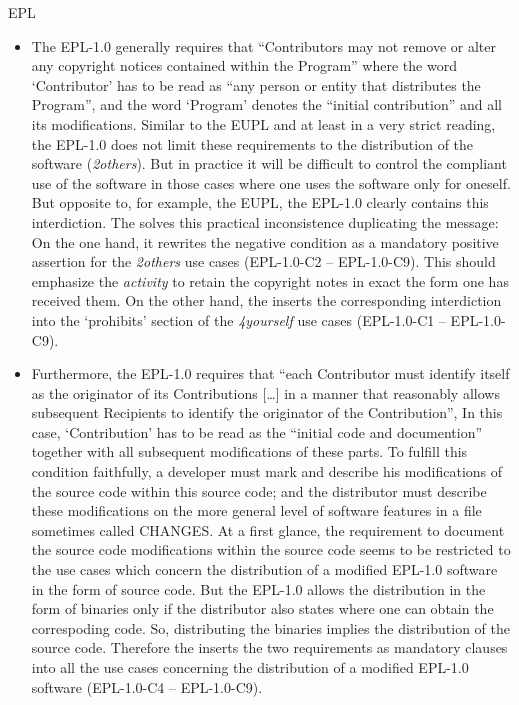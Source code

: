 \begin{license}{EPL}
\begin{itemize}
  \item The EPL-1.0 generally requires that \enquote{Contributors may not remove or
    alter any copyright notices contained within the Program} where
    the word `Contributor' has to be read as \enquote{any person or entity that
    distributes the Program}, and the word `Program' denotes the
    \enquote{initial contribution} and all its modifications. 
    Similar to the EUPL and at least in a very strict reading, the EPL-1.0 does not
    limit these requirements to the distribution of the software
    (\emph{2others}). But in practice it will be difficult to control the
    compliant use of the software in those cases where one uses the software
    only for oneself. But opposite to, for example, the EUPL, the EPL-1.0 clearly
    contains this interdiction. The \oslic{} solves this practical inconsistence
    duplicating the message: On the one hand, it rewrites the negative condition
    as a mandatory positive assertion for the \emph{2others} use cases (EPL-1.0-C2 --
    EPL-1.0-C9). This should emphasize the \emph{activity} to retain the copyright
    notes in exact the form one has received them. On the other hand, the \oslic{}
    inserts the corresponding interdiction into the `prohibits' section of the
    \emph{4yourself} use cases (EPL-1.0-C1 -- EPL-1.0-C9).
  
  \item Furthermore, the EPL-1.0 requires that \enquote{each Contributor must
    identify itself as the originator of its Contributions [\ldots] in a manner
    that reasonably allows subsequent Recipients to identify the originator of
    the Contribution}, In this case, `Contribution' has to be read
    as the \enquote{initial code and documention} together with all subsequent
    modifications of these parts. To fulfill this condition
    faithfully, a developer must mark and describe his modifications of the
    source code within this source code; and the distributor must describe these
    modifications on the more general level of software features in a file
    sometimes called CHANGES. At a first glance, the requirement to document the
    source code modifications within the source code seems to be restricted to
    the use cases which concern the distribution of a modified EPL-1.0 software in
    the form of source code. But the EPL-1.0 allows the distribution in the form of
    binaries only if the distributor also states where one can obtain the
    correspoding code. So, distributing the binaries implies the
    distribution of the source code.  Therefore the \oslic{} inserts the two
    requirements as mandatory clauses into all the use cases concerning the
    distribution of a modified EPL-1.0 software (EPL-1.0-C4 -- EPL-1.0-C9).
  

\end{itemize}
\end{license}
